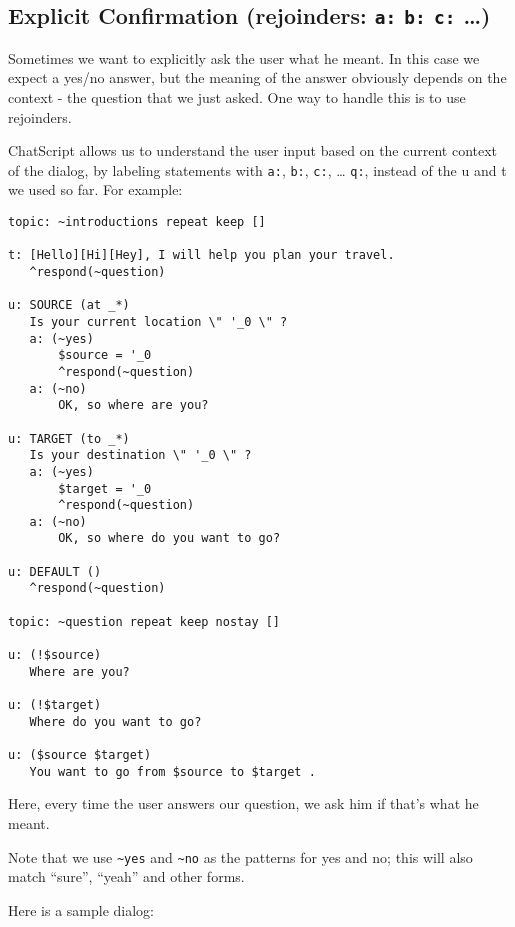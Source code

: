 \documentclass[]{article}
\begin{document}
\subsection{\texorpdfstring{Explicit Confirmation (rejoinders:
\texttt{a:} \texttt{b:} \texttt{c:}
\ldots{})}{Explicit Confirmation (rejoinders: a: b: c: \ldots{})}}\label{explicit-confirmation-rejoinders-a-b-c}

Sometimes we want to explicitly ask the user what he meant. In this case
we expect a yes/no answer, but the meaning of the answer obviously
depends on the context - the question that we just asked. One way to
handle this is to use rejoinders.

ChatScript allows us to understand the user input based on the current
context of the dialog, by labeling statements with \texttt{a:},
\texttt{b:}, \texttt{c:}, \ldots{} \texttt{q:}, instead of the u and t
we used so far. For example:

\begin{verbatim}
topic: ~introductions repeat keep []

t: [Hello][Hi][Hey], I will help you plan your travel.
   ^respond(~question)

u: SOURCE (at _*)
   Is your current location \" '_0 \" ?
   a: (~yes)
       $source = '_0
       ^respond(~question)
   a: (~no)
       OK, so where are you?

u: TARGET (to _*)
   Is your destination \" '_0 \" ?
   a: (~yes)
       $target = '_0
       ^respond(~question)
   a: (~no)
       OK, so where do you want to go?

u: DEFAULT ()
   ^respond(~question)

topic: ~question repeat keep nostay []

u: (!$source)
   Where are you?

u: (!$target)
   Where do you want to go?

u: ($source $target)
   You want to go from $source to $target . 
\end{verbatim}

Here, every time the user answers our question, we ask him if that's
what he meant.

Note that we use \texttt{\textasciitilde{}yes} and
\texttt{\textasciitilde{}no} as the patterns for yes and no; this will
also match ``sure'', ``yeah'' and other forms.

Here is a sample dialog:
\end{document}
